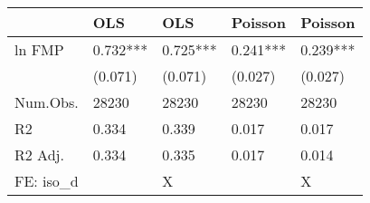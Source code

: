 \begin{tabular}{lllll}
\hline
& OLS & OLS  & Poisson & Poisson  \\ \hline
ln FMP & \num{0.732}*** & \num{0.725}*** & \num{0.241}*** & \num{0.239}*** \\
& (\num{0.071}) & (\num{0.071}) & (\num{0.027}) & (\num{0.027}) \\
Num.Obs. & \num{28230} & \num{28230} & \num{28230} & \num{28230} \\
R2 & \num{0.334} & \num{0.339} & \num{0.017} & \num{0.017} \\
R2 Adj. & \num{0.334} & \num{0.335} & \num{0.017} & \num{0.014} \\
FE: iso\_d &  & X &  & X \\
\hline
\end{tabular}
